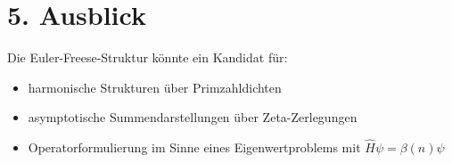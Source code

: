 \documentclass[a4paper,12pt]{article}
\begin{document}
\section*{5. Ausblick}
Die Euler-Freese-Struktur könnte ein Kandidat für:
\begin{itemize}
    \item harmonische Strukturen über Primzahldichten
    \item asymptotische Summendarstellungen über Zeta-Zerlegungen
    \item Operatorformulierung im Sinne eines Eigenwertproblems mit $\hat{H} \psi = \beta(n) \psi$
\end{itemize}
\end{document}
